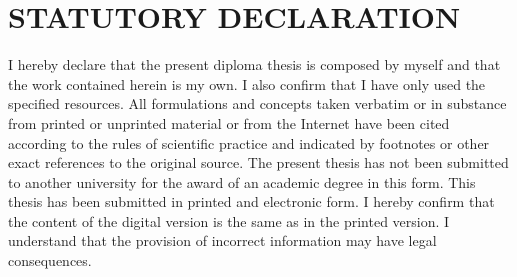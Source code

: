 %
% 
% 

\newpage 

\section*{STATUTORY DECLARATION}

\vspace{1cm}

I hereby declare that the present diploma thesis is composed by myself and that the work
contained herein is my own. I also confirm that I have only used the specified resources.
All formulations and concepts taken verbatim or in substance from printed or unprinted
material or from the Internet have been cited according to the rules of scientific practice
and indicated by footnotes or other exact references to the original source. The present
thesis has not been submitted to another university for the award of an academic degree in
this form. This thesis has been submitted in printed and electronic form. I hereby confirm
that the content of the digital version is the same as in the printed version. I understand
that the provision of incorrect information may have legal consequences.

\vspace{4cm}

\ThesisAuthorName \hfill \DateAndLocation




